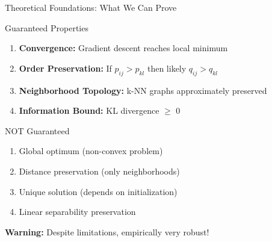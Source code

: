 \documentclass[aspectratio=169]{beamer}
\newcommand{\warning}[1]{\colorbox{red!10}{\textcolor{warningcolor}{\textbf{Warning:} #1}}}
\begin{document}
\begin{frame}{Theoretical Foundations: What We Can Prove}
\begin{block}{Guaranteed Properties}
\begin{enumerate}
\item \textbf{Convergence:} Gradient descent reaches local minimum
\item \textbf{Order Preservation:} If $p_{ij} > p_{kl}$ then likely $q_{ij} > q_{kl}$
\item \textbf{Neighborhood Topology:} k-NN graphs approximately preserved
\item \textbf{Information Bound:} KL divergence $\geq$ 0
\end{enumerate}
\end{block}

\begin{block}{NOT Guaranteed}
\begin{enumerate}
\item Global optimum (non-convex problem)
\item Distance preservation (only neighborhoods)
\item Unique solution (depends on initialization)
\item Linear separability preservation
\end{enumerate}
\end{block}

\warning{Despite limitations, empirically very robust!}
\end{frame}
\end{document}
